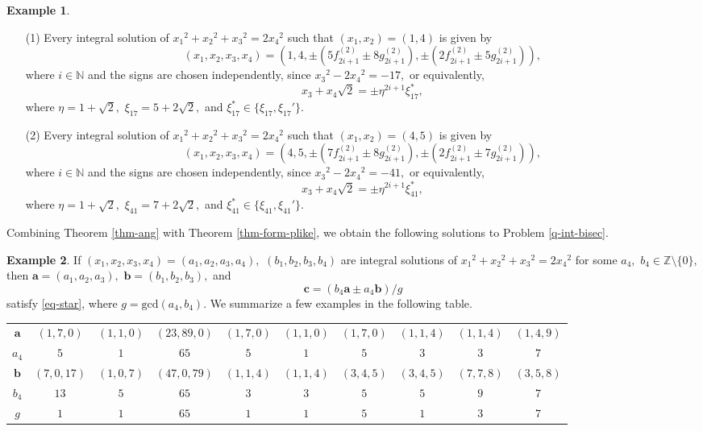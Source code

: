 \documentclass{article}
\theoremstyle{definition}
\newtheorem{eg}{Example}
\theoremstyle{plain}
\begin{document}
\begin{eg}\label{eg-sol-pell}
\begin{enumerate}
\item[(1)]
Every integral solution of $x_1{}^2+x_2{}^2+x_3{}^2 = 2x_4{}^2$ such that $(x_1,x_2) = (1,4)$ is given by 
\[ (x_1,x_2,x_3,x_4) = (1,4,\pm (5f_{2i+1}^{(2)}\pm 8g_{2i+1}^{(2)}),\pm (2f_{2i+1}^{(2)}\pm 5g_{2i+1}^{(2)})),\] 
where $i \in \mathbb N$ and the signs are chosen independently, since $x_3{}^2-2x_4{}^2 = -17,$ or equivalently, 
\[ x_3+x_4\sqrt 2 = \pm\eta ^{2i+1}\xi _{17}^*,\] 
where $\eta = 1+\sqrt 2,$ $\xi _{17} = 5+2\sqrt 2,$ and $\xi _{17}^* \in \{\xi _{17},\xi _{17}{}'\}.$
\item[(2)]
Every integral solution of $x_1{}^2+x_2{}^2+x_3{}^2 = 2x_4{}^2$ such that $(x_1,x_2) = (4,5)$ is given by 
\[ (x_1,x_2,x_3,x_4) = (4,5,\pm (7f_{2i+1}^{(2)}\pm 8g_{2i+1}^{(2)}),\pm (2f_{2i+1}^{(2)}\pm 7g_{2i+1}^{(2)})),\] 
where $i \in \mathbb N$ and the signs are chosen independently, since $x_3{}^2-2x_4{}^2 = -41,$ or equivalently, 
\[ x_3+x_4\sqrt 2 = \pm\eta ^{2i+1}\xi _{41}^*,\] 
where $\eta = 1+\sqrt 2,$ $\xi _{41} = 7+2\sqrt 2,$ and $\xi _{41}^* \in \{\xi _{41},\xi _{41}{}'\}.$
\end{enumerate}
\end{eg}
Combining Theorem \ref{thm-ang} with Theorem \ref{thm-form-plike}, we obtain the following solutions to Problem \ref{q-int-bisec}.
\begin{eg}
If $(x_1,x_2,x_3,x_4) = (a_1,a_2,a_3,a_4),$ $(b_1,b_2,b_3,b_4)$ are integral solutions of $x_1{}^2+x_2{}^2+x_3{}^2 = 2x_4{}^2$ for some $a_4,$ $b_4 \in \mathbb Z\setminus\{ 0\},$ then $\bm{a} = (a_1,a_2,a_3),$ $\bm{b} = (b_1,b_2,b_3),$ and 
\[\bm{c} = (b_4\bm{a}\pm a_4\bm{b})/g\] 
satisfy \eqref{eq-star}, where $g = \mathrm{gcd}(a_4,b_4).$ 
We summarize a few examples in the following table. 
\begin{center}\begin{tabular}{|c||c|c|c|c|c|c|c|c|c|} \hline 
$\bm{a}$ & $(1,7,0)$ & $(1,1,0)$ & $(23,89,0)$ & $(1,7,0)$ & $(1,1,0)$ & $(1,7,0)$ & $(1,1,4)$ & $(1,1,4)$ & $(1,4,9)$ \\ 
$a_4$ & $5$ & $1$ & $65$ & $5$ & $1$ & $5$ & $3$ & $3$ & $7$ \\ 
$\bm{b}$ & $(7,0,17)$ & $(1,0,7)$ & $(47,0,79)$ & $(1,1,4)$ & $(1,1,4)$ & $(3,4,5)$ & $(3,4,5)$ & $(7,7,8)$ & $(3,5,8)$ \\ 
$b_4$ & $13$ & $5$ & $65$ & $3$ & $3$ & $5$ & $5$ & $9$ & $7$ \\ 
$g$ & $1$ & $1$ & $65$ & $1$ & $1$ & $5$ & $1$ & $3$ & $7$ \\ \hline 
\end{tabular}\end{center}
\end{eg}
\end{document}
